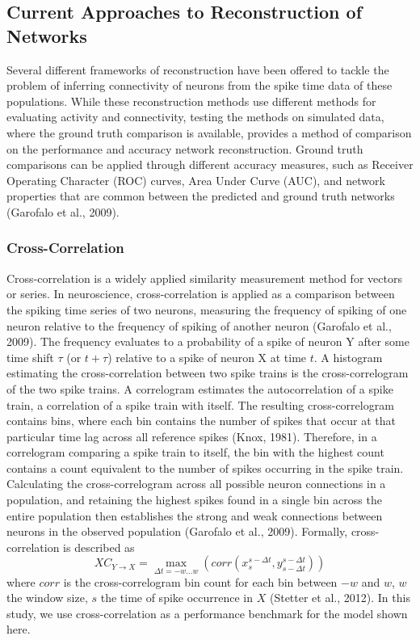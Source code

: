 \documentclass[11pt,titlepage]{article}
\begin{document}
\subsection{Current Approaches to Reconstruction of Networks}
Several different frameworks of reconstruction have been offered to tackle the problem of inferring connectivity of neurons from the spike time data of these populations. While these reconstruction methods use different methods for evaluating activity and connectivity, testing the methods on simulated data, where the ground truth comparison is available, provides a method of comparison on the performance and accuracy network reconstruction. Ground truth comparisons can be applied through different accuracy measures, such as Receiver Operating Character (ROC) curves, Area Under Curve (AUC), and network properties that are common between the predicted and ground truth networks (Garofalo et al., 2009).\par

\subsubsection{Cross-Correlation}
Cross-correlation is a widely applied similarity measurement method for vectors or series. In neuroscience, cross-correlation is applied as a comparison between the spiking time series of two neurons, measuring the frequency of spiking of one neuron relative to the frequency of spiking of another neuron (Garofalo et al., 2009). The frequency evaluates to a probability of a spike of neuron Y after some time shift $\tau$ (or $t + \tau$) relative to a spike of neuron X at time $t$. A histogram estimating the cross-correlation between two spike trains is the cross-correlogram of the two spike trains. A correlogram estimates the autocorrelation of a spike train, a correlation of a spike train with itself. The resulting cross-correlogram contains bins, where each bin contains the number of spikes that occur at that particular time lag across all reference spikes (Knox, 1981). Therefore, in a correlogram comparing a spike train to itself, the bin with the highest count contains a count equivalent to the number of spikes occurring in the spike train. Calculating the cross-correlogram across all possible neuron connections in a population, and retaining the highest spikes found in a single bin across the entire population then establishes the strong and weak connections between neurons in the observed population (Garofalo et al., 2009). Formally, cross-correlation is described as
$$XC_{Y \rightarrow X} = \max_{\Delta t = -w ... w} (corr(x_s^{s-\Delta t},y_{s-\Delta t}^{s-\Delta t} ))$$
where $corr$ is the cross-correlogram bin count for each bin between $-w$ and $w$, $w$ the window size, $s$ the time of spike occurrence in $X$ (Stetter et al., 2012). In this study, we use cross-correlation as a performance benchmark for the model shown here.
\end{document}
